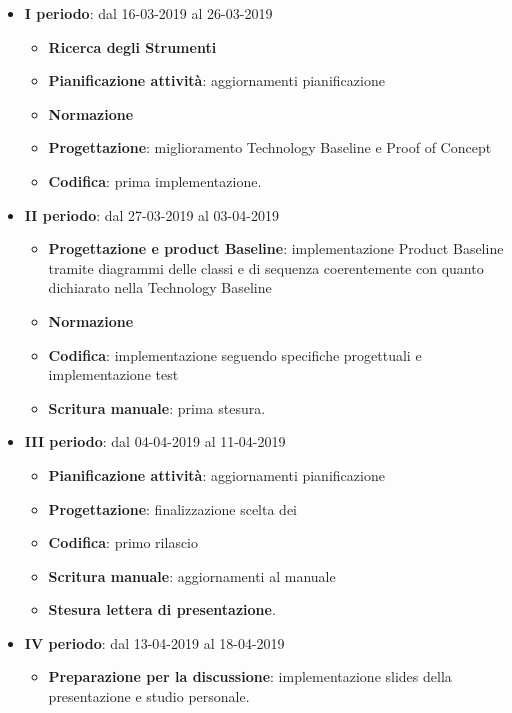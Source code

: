		\begin{itemize}
			\item \textbf{I periodo}: dal 16-03-2019 al 26-03-2019
			\begin{itemize}
    	        \item \textbf{Ricerca degli Strumenti}
    	        \item \textbf{Pianificazione attività}: aggiornamenti pianificazione
    	        \item \textbf{Normazione}
    	        \item \textbf{Progettazione}: miglioramento Technology Baseline e Proof of Concept
    	        \item \textbf{Codifica}: prima implementazione.
        	\end{itemize}
			\item \textbf{II periodo}: dal 27-03-2019 al 03-04-2019
			\begin{itemize}
				\item \textbf{Progettazione e product Baseline}: implementazione Product Baseline tramite diagrammi delle classi e di sequenza
				coerentemente con quanto dichiarato nella Technology Baseline
    	        \item \textbf{Normazione}
    	        \item \textbf{Codifica}: implementazione seguendo specifiche progettuali e implementazione test
    	        \item \textbf{Scritura manuale}: prima stesura.
        	\end{itemize}
        	\item \textbf{III periodo}: dal 04-04-2019 al 11-04-2019
			\begin{itemize}
				\item \textbf{Pianificazione attività}: aggiornamenti pianificazione
    	        \item \textbf{Progettazione}: finalizzazione scelta dei 
    	        \item \textbf{Codifica}: primo rilascio
    	        \item \textbf{Scritura manuale}: aggiornamenti al manuale
    	        \item \textbf{Stesura lettera di presentazione}.
        	\end{itemize}
        	\item \textbf{IV periodo}: dal 13-04-2019 al 18-04-2019
			\begin{itemize}
				\item \textbf{Preparazione per la discussione}: implementazione slides della presentazione e studio personale.
        	\end{itemize}
        \end{itemize}

